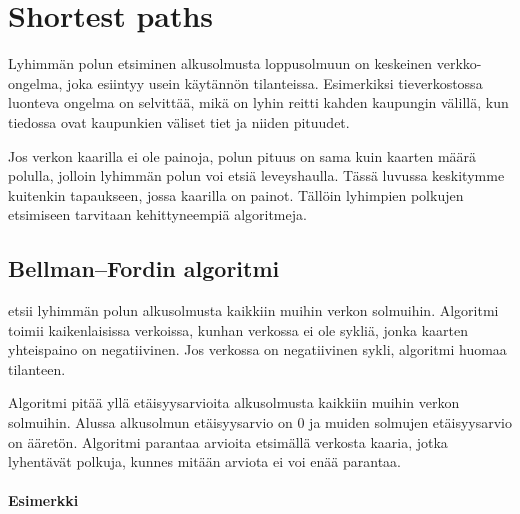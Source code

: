 \chapter{Shortest paths}


Lyhimmän polun etsiminen alkusolmusta loppusolmuun
on keskeinen verkko-ongelma, joka esiintyy usein
käytännön tilanteissa.
Esimerkiksi tieverkostossa
luonteva ongelma on selvittää,
mikä on lyhin reitti kahden kaupungin välillä,
kun tiedossa ovat kaupunkien väliset tiet ja niiden pituudet.

Jos verkon kaarilla ei ole painoja,
polun pituus on sama kuin kaarten
määrä polulla, jolloin lyhimmän polun
voi etsiä leveyshaulla.
Tässä luvussa keskitymme kuitenkin
tapaukseen, jossa kaarilla on painot.
Tällöin lyhimpien polkujen etsimiseen
tarvitaan kehittyneempiä algoritmeja.

\section{Bellman–Fordin algoritmi}


 etsii
lyhimmän polun alkusolmusta
kaikkiin muihin verkon solmuihin.
Algoritmi toimii kaikenlaisissa verkoissa,
kunhan verkossa ei ole sykliä,
jonka kaarten yhteispaino on negatiivinen.
Jos verkossa on negatiivinen sykli,
algoritmi huomaa tilanteen.

Algoritmi pitää yllä etäisyysarvioita
alkusolmusta kaikkiin muihin verkon solmuihin.
Alussa alkusolmun etäisyysarvio on 0
ja muiden solmujen etäisyys\-arvio on ääretön.
Algoritmi parantaa arvioita
etsimällä verkosta kaaria,
jotka lyhentävät polkuja,
kunnes mitään arviota ei voi enää parantaa.

\subsubsection{Esimerkki}


